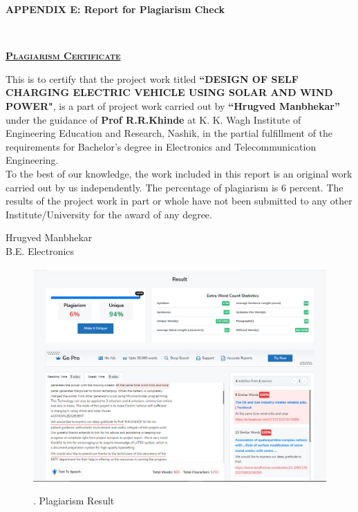 \documentclass[a4paper,12pt]{article}
\begin{document}
\newpage
\begin{center}
\LARGE\textbf{APPENDIX E: Report for Plagiarism Check}
\\[1cm]
\end{center}
\thispagestyle{empty}
\begin{center}
\textbf{\LARGE\scshape\underline{Plagiarism Certificate}}\\[2cm]
\end{center}
\large This is to certify that the project work titled \textbf{“DESIGN OF SELF CHARGING ELECTRIC VEHICLE USING SOLAR AND WIND POWER"}, is a part of project work carried out by \textbf{“Hrugved Manbhekar”}
under the guidance of\textbf{ Prof R.R.Khinde} at K. K. Wagh Institute of
Engineering Education and Research, Nashik, in the partial fulfillment of the requirements
for Bachelor’s degree in Electronics and Telecommunication Engineering.\\
\large To the best of our knowledge, the work included in this report is an original work
carried out by us independently. The percentage of plagiarism is 6 percent. The results of the
project work in part or whole have not been submitted to any other Institute/University for
the award of any degree.

\vspace{4cm}
\begin{flushright}
Hrugved Manbhekar\\

B.E. Electronics\\
\end{flushright}

\newpage
\begin{figure}[!h]
\centering
\includegraphics[scale=0.5]{pl.png}\\
\caption{. Plagiarism Result}
\end{figure}
\end{document}
